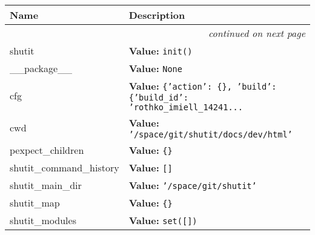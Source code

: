     \vspace{-1cm}
\hspace{\varindent}\begin{longtable}{|p{\varnamewidth}|p{\vardescrwidth}|l}
\cline{1-2}
\cline{1-2} \centering \textbf{Name} & \centering \textbf{Description}& \\
\cline{1-2}
\endhead\cline{1-2}\multicolumn{3}{r}{\small\textit{continued on next page}}\\\endfoot\cline{1-2}
\endlastfoot\raggedright s\-h\-u\-t\-i\-t\- & \raggedright \textbf{Value:} 
{\tt init()}&\\
\cline{1-2}
\raggedright \_\-\_\-p\-a\-c\-k\-a\-g\-e\-\_\-\_\- & \raggedright \textbf{Value:} 
{\tt None}&\\
\cline{1-2}
\raggedright c\-f\-g\- & \raggedright \textbf{Value:} 
{\tt \texttt{\{}\texttt{'}\texttt{action}\texttt{'}\texttt{: }\texttt{\{}\texttt{\}}\texttt{, }\texttt{'}\texttt{build}\texttt{'}\texttt{: }\texttt{\{}\texttt{'}\texttt{build\_id}\texttt{'}\texttt{: }\texttt{'}\texttt{rothko\_imiell\_14241}\texttt{...}}&\\
\cline{1-2}
\raggedright c\-w\-d\- & \raggedright \textbf{Value:} 
{\tt \texttt{'}\texttt{/space/git/shutit/docs/dev/html}\texttt{'}}&\\
\cline{1-2}
\raggedright p\-e\-x\-p\-e\-c\-t\-\_\-c\-h\-i\-l\-d\-r\-e\-n\- & \raggedright \textbf{Value:} 
{\tt \texttt{\{}\texttt{\}}}&\\
\cline{1-2}
\raggedright s\-h\-u\-t\-i\-t\-\_\-c\-o\-m\-m\-a\-n\-d\-\_\-h\-i\-s\-t\-o\-r\-y\- & \raggedright \textbf{Value:} 
{\tt \texttt{[}\texttt{]}}&\\
\cline{1-2}
\raggedright s\-h\-u\-t\-i\-t\-\_\-m\-a\-i\-n\-\_\-d\-i\-r\- & \raggedright \textbf{Value:} 
{\tt \texttt{'}\texttt{/space/git/shutit}\texttt{'}}&\\
\cline{1-2}
\raggedright s\-h\-u\-t\-i\-t\-\_\-m\-a\-p\- & \raggedright \textbf{Value:} 
{\tt \texttt{\{}\texttt{\}}}&\\
\cline{1-2}
\raggedright s\-h\-u\-t\-i\-t\-\_\-m\-o\-d\-u\-l\-e\-s\- & \raggedright \textbf{Value:} 
{\tt \texttt{set([}\texttt{])}}&\\
\cline{1-2}
\end{longtable}



